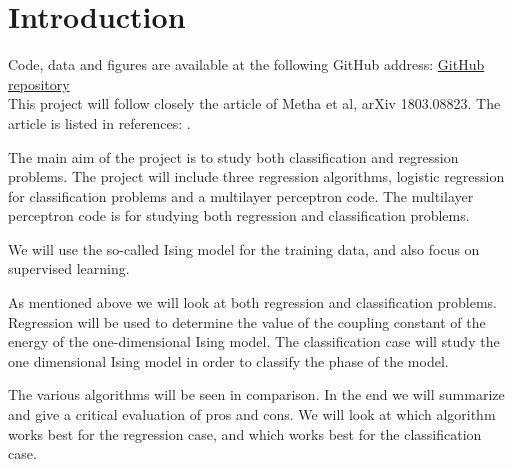 \section{Introduction}
Code, data and figures are available at the following GitHub address:
\href{https://github.com/geirtul/fys-stk4155/tree/master/project2}{GitHub repository}\\
This project will follow closely the article of Metha et al, arXiv 1803.08823. 
The article is listed in references: \cite{HighBias}.

The main aim of the project is to study both classification and regression 
problems. The project will include three regression algorithms, 
logistic regression for classification problems and a multilayer 
perceptron code. The multilayer perceptron code is for studying both regression
and classification problems.

We will use the so-called Ising model for the training data, and also 
focus on supervised learning. 

As mentioned above we will look at both regression and classification problems.
Regression will be used to determine the value of the coupling constant
of the energy of the one-dimensional Ising model. 
The classification case will study the one dimensional Ising model in order to
classify the phase of the model. 

The various algorithms will be seen in comparison. In the end we will
summarize and give a critical evaluation of pros and cons. 
We will look at which algorithm works best for the regression case, 
and which works best for the classification case. \cite{Project2} 
